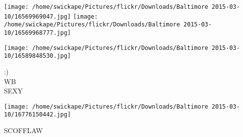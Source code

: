 \documentclass[10pt,letterpaper]{article}
\begin{document}
\texttt{[image: /home/swickape/Pictures/flickr/Downloads/Baltimore 2015-03-10/16569969047.jpg]}
\texttt{[image: /home/swickape/Pictures/flickr/Downloads/Baltimore 2015-03-10/16569968777.jpg]}

\texttt{[image: /home/swickape/Pictures/flickr/Downloads/Baltimore 2015-03-10/16589848530.jpg]}

:)\\
WB\\
SEXY
\pagebreak

\texttt{[image: /home/swickape/Pictures/flickr/Downloads/Baltimore 2015-03-10/16776150442.jpg]}

SCOFFLAW
\pagebreak
\end{document}

